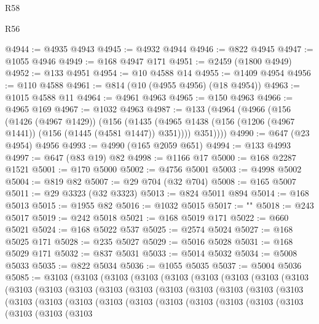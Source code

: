 \begin{lexlean}{R58}
\begin{lexlean}{R56}
\begin{coremodule}
{{{{{{{{{{{{{{{{{{{{{{{{{{{{{{{{{{{{{{{{{{{{{{{{{{{{{{{{{{{{{{{{{{{{{{{{{{{{{{{{{{{{{{{{{{{{{{{{{{{{{{{{{{{{{{{{{{{{{{{{{{{{{{{{{{{{{{{{{{{{{{{{{{{{{{{{{{{{{{{{{{{{{{{{{{{{{{{{{{{{{{{{{{{{{{{{{{{{{{{{{{{{{{{{{{{@4944 := @4935 @4943
@4945 := @4932 @4944
@4946 := @822 @4945
@4947 := @1055 @4946
@4949 := @168 @4947 @171
@4951 := @2459 (@1800 @4949)
@4952 := @133 @4951
@4954 := @10 @4588 @14
@4955 := @1409 @4954
@4956 := @110 @4588
@4961 := @814 (@10 (@4955 @4956) (@18 @4954))
@4963 := @1015 @4588 @11
@4964 := @4961 @4963
@4965 := @150 @4963
@4966 := @4965 @169
@4967 := @1032 @4963
@4987 := @133
    (@4964
      (@4966
        (@156
          (@1426 (@4967 @1429))
          (@156
            (@1435 (@4965 @1438 (@156 (@1206 (@4967 @1441)) (@156 (@1445 (@4581 @1447)) @351))))
            @351))))
@4990 := @647 (@23 @4954) @4956
@4993 := @4990 (@165 @2059 @651)
@4994 := @133 @4993
@4997 := @647 (@83 @19) @82
@4998 := @1166 @17
@5000 := @168 @2287 @1521
@5001 := @170 @5000
@5002 := @4756 @5001
@5003 := @4998 @5002
@5004 := @819 @82
@5007 := @29 @704 (@32 @704)
@5008 := @165 @5007
@5011 := @29 @3323 (@32 @3323)
@5013 := @824 @5011 @894
@5014 := @168 @5013
@5015 := @1955 @82
@5016 := @1032 @5015
@5017 := "\n"
@5018 := @243 @5017
@5019 := @242 @5018
@5021 := @168 @5019 @171
@5022 := @660 @5021
@5024 := @168 @5022 @537
@5025 := @2574 @5024
@5027 := @168 @5025 @171
@5028 := @235 @5027
@5029 := @5016 @5028
@5031 := @168 @5029 @171
@5032 := @837 @5031
@5033 := @5014 @5032
@5034 := @5008 @5033
@5035 := @822 @5034
@5036 := @1055 @5035
@5037 := @5004 @5036
@5085 := @3103
    (@3103
      (@3103
        (@3103
          (@3103
            (@3103
              (@3103
                (@3103
                  (@3103
                    (@3103
                      (@3103
                        (@3103
                          (@3103
                            (@3103
                              (@3103
                                (@3103
                                  (@3103
                                    (@3103
                                      (@3103
                                        (@3103
                                          (@3103
                                            (@3103
                                              (@3103
                                                (@3103
                                                  (@3103
                                                    (@3103
                                                      (@3103
                                                        (@3103
                                                          (@3103
                                                            (@3103
                                                              (@3103
                                                                (@3103
}}}}}}}}}}}}}}}}}}}}}}}}}}}}}}}}}}}}}}}}}}}}}}}}}}}}}}}}}}}}}}}}}}}}}}}}}}}}}}}}}}}}}}}}}}}}}}}}}}}}}}}}}}}}}}}}}}}}}}}}}}}}}}}}}}}}}}}}}}}}}}}}}}}}}}}}}}}}}}}}}}}}}}}}}}}}}}}}}}}}}}}}}}}}}}}}}}}}}}}}}}}}}}}}}}}
\end{coremodule}
\end{lexlean}
\end{lexlean}
